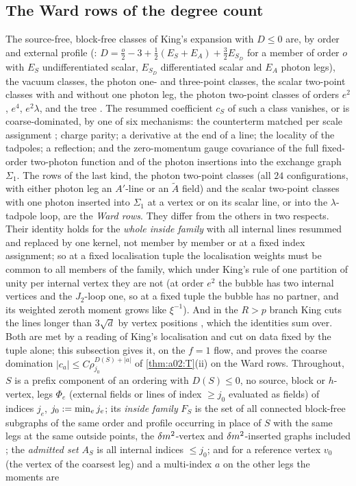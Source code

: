 \subsection{The Ward rows of the degree count}\label{ssec:a02:ward}

The source-free, block-free classes of King's expansion with $D\le0$ are, by order and external profile (\cite[(3.30)--(3.31)]{K1}: $D=\frac o2-3+\frac12(E_S+E_A)+\frac32E_{S_D}$ for a member of order $o$ with $E_S$ undifferentiated scalar, $E_{S_D}$ differentiated scalar and $E_A$ photon legs), the vacuum classes, the photon one- and three-point classes, the scalar two-point classes with and without one photon leg, the photon two-point classes of orders $e^2$, $e^4$, $e^2\lambda$, and the tree \cite[(2.4)]{Ba3}. The resummed coefficient $c_S$ of such a class vanishes, or is coarse-dominated, by one of six mechanisms: the counterterm matched per scale assignment \cite[(3.33)--(3.35)]{K1}; charge parity; a derivative at the end of a line; the locality of the tadpoles; a reflection; and the zero-momentum gauge covariance of the full fixed-order two-photon function and of the photon insertions into the exchange graph $\Sigma_1$. The rows of the last kind, the photon two-point classes (all $24$ configurations, with either photon leg an $A'$-line or an $\tilde A$ field) and the scalar two-point classes with one photon inserted into $\Sigma_1$ at a vertex or on its scalar line, or into the $\lambda$-tadpole loop, are the \emph{Ward rows}. They differ from the others in two respects. Their identity holds for the \emph{whole inside family} with all internal lines resummed and replaced by one kernel, not member by member or at a fixed index assignment; so at a fixed localisation tuple the localisation weights must be common to all members of the family, which under King's rule of one partition of unity per internal vertex \cite[(3.36)]{K1} they are not (at order $e^2$ the bubble has two internal vertices and the $J_2$-loop one, so at a fixed tuple the bubble has no partner, and its weighted zeroth moment grows like $\xi^{-1}$). And in the $R>p$ branch \cite[(3.38)]{K1} King cuts the lines longer than $3\sqrt d$ by vertex positions \cite[p.~666]{K1}, which the identities sum over. Both are met by a reading of King's localisation and cut on data fixed by the tuple alone; this subsection gives it, on the $f=1$ flow, and proves the coarse domination $|c_a|\le C\rho_{j_0}^{D(S)+|a|}$ of \cref{thm:a02:T}(ii) on the Ward rows. Throughout, $S$ is a prefix component of an ordering with $D(S)\le0$, no source, block or $h$-vertex, legs $\Phi_e$ (external fields or lines of index $\ge j_0$ evaluated as fields) of indices $j_e$, $j_0:=\min_ej_e$; its \emph{inside family} $F_S$ is the set of all connected block-free subgraphs of the same order and profile occurring in place of $S$ with the same legs at the same outside points, the $\delta m^2$-vertex and $\delta m^2$-inserted graphs included \cite[p.~431]{Ba3}; the \emph{admitted set} $A_S$ is all internal indices $\le j_0$; and for a reference vertex $v_0$ (the vertex of the coarsest leg) and a multi-index $a$ on the other legs the moments are 